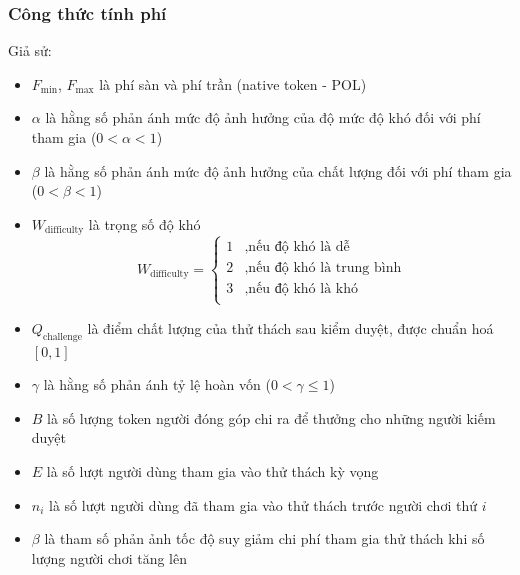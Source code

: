 \subsubsection{Công thức tính phí}

Giả sử: 
\begin{itemize}
  \item $F_{\min}$, $F_{\max}$ là phí sàn và phí trần (native token - POL)
  \item $\alpha$ là hằng số phản ánh mức độ ảnh hưởng của độ mức độ khó đối với phí tham gia ($0<\alpha<1$) 
  \item $\beta$ là hằng số phản ánh mức độ ảnh hưởng của chất lượng đối với phí tham gia ($0<\beta<1$)
  \item $W_{\text{difficulty}}$ là trọng số độ khó
    \[
      W_{\text{difficulty}} =
      \begin{cases}
        1   & , \text{nếu độ khó là dễ}         \\
        2   & , \text{nếu độ khó là trung bình} \\
        3   & , \text{nếu độ khó là khó}        \\
      \end{cases}
    \]
  \item $Q_{\text{challenge}}$ là điểm chất lượng của thử thách sau kiểm duyệt, được chuẩn hoá $[0,1]$
  \item $\gamma$ là hằng số phản ánh tỷ lệ hoàn vốn ($0 < \gamma \le 1$)
  \item $B$ là số lượng token người đóng góp chi ra để thưởng cho những người kiếm duyệt 
  \item $E$ là số lượt người dùng tham gia vào thử thách kỳ vọng
  \item $n_i$ là số lượt người dùng đã tham gia vào thử thách trước người chơi thứ $i$
  \item $\beta$ là tham số phản ảnh tốc độ suy giảm chi phí tham gia thử thách khi số lượng người chơi tăng lên
\end{itemize}

